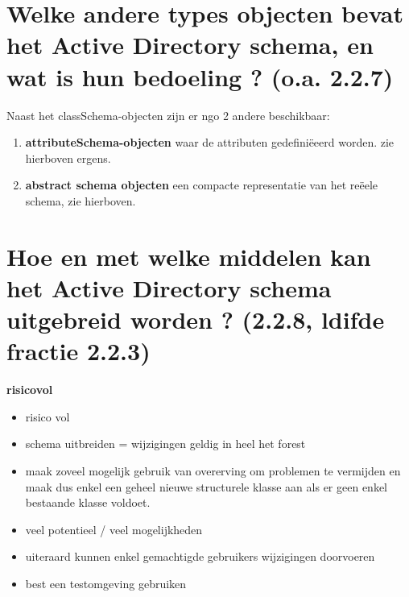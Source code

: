 \section{Welke andere types objecten bevat het Active Directory schema, en wat is hun bedoeling ? (o.a. 2.2.7)}

Naast het classSchema-objecten zijn er ngo 2 andere beschikbaar:
\begin{enumerate}
\item \textbf{attributeSchema-objecten} waar de attributen gedefini\"eeerd worden. zie hierboven ergens.
\item \textbf{abstract schema objecten} een compacte representatie van het re\"eele schema, zie hierboven.
\end{enumerate}
\clearpage
\section{Hoe en met welke middelen kan het Active Directory schema uitgebreid worden ? (2.2.8, ldifde fractie 2.2.3)}

\textbf{risicovol}
\begin{itemize}
\item risico vol
\item schema uitbreiden = wijzigingen geldig in heel het forest
\item maak zoveel mogelijk gebruik van overerving om problemen te vermijden en maak dus enkel een geheel nieuwe structurele klasse aan als er geen enkel bestaande klasse voldoet.
\item veel potentieel / veel mogelijkheden
\item uiteraard kunnen enkel gemachtigde gebruikers wijzigingen doorvoeren
\item best een testomgeving gebruiken
\end{itemize}

